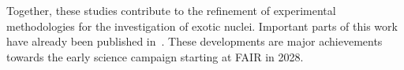 Together, these studies contribute to the refinement of experimental methodologies for the investigation of exotic nuclei. Important parts of this work have already been published in~\cite{ponnath2024measurement,JENEGGER2026171048,morfouace2025asymmetric}. These developments are major achievements towards the early science campaign starting at FAIR in 2028.

